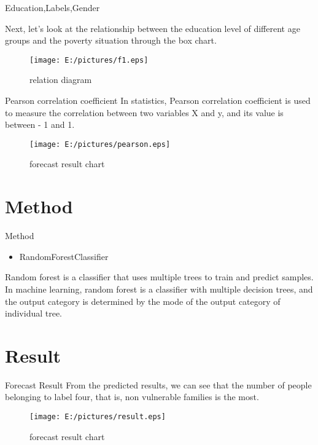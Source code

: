 \documentclass[
 size=12pt,
 paper=smartboard, %
 mode=present, %
 display=slides, %
style=tuliplab,
pauseslide,
fleqn,leqno]{powerdot}
\begin{document}
\begin{slide}{Education,Labels,Gender} 


\setlength{\parindent}{1.5em}
Next, let's look at the relationship between the education level of different age groups and the poverty situation through the box chart.
\begin{figure}[ht]%
  \centering%
  \texttt{[image: E:/pictures/f1.eps]}
  \caption{relation diagram}%
  \end{figure}
    

\end{slide}
\begin{slide}{Pearson correlation coefficient}
  \setlength{\parindent}{1.5em}
  In statistics, Pearson correlation coefficient is used to measure the correlation between two variables X and y, and its value is between - 1 and 1.
  \begin{figure}[ht]%
    \centering%
    \texttt{[image: E:/pictures/pearson.eps]}
    \caption{forecast result chart}%
    \end{figure}
\vspace{1cm}

  
\end{slide}


\tableofcontents[content=sections]
\section{Method}
    \begin{slide}{Method}
      \setlength{\parindent}{1.5em}
      \begin{itemize}
        \item RandomForestClassifier
      \end{itemize}
      
      Random forest is a classifier that uses multiple trees to train and predict samples. In machine learning, random forest is a classifier with multiple decision trees, and the output category is determined by the mode of the output category of individual tree.
     
    \end{slide}


\tableofcontents[content=sections]
\section{Result}
    \begin{slide}{Forecast Result}
      \setlength{\parindent}{1.5em}
      From the predicted results, we can see that the number of people belonging to label four, that is, non vulnerable families is the most.
      \begin{figure}[ht]%
        \centering%
        \texttt{[image: E:/pictures/result.eps]}
        \caption{forecast result chart}%
        \end{figure}
    \end{slide}
\end{document}
